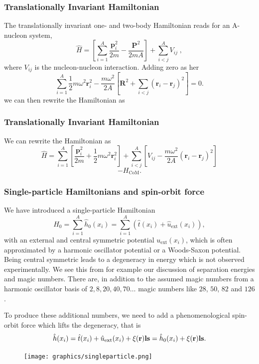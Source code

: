 \documentclass[compress]{beamer}
\renewcommand{\vec}[1]{\mathbf{#1}}
\renewcommand{\vec}[1]{\boldsymbol{#1}}
\begin{document}
 \frame
 {
 \frametitle{Translationally Invariant Hamiltonian}
 The translationally invariant one- and two-body 
 Hamiltonian reads
 for an A-nucleon system,
 \[\label{eq:ham}
\hat{H}=\left[\sum_{i=1}^A\frac{\vec{p}_i^2}{2m} -\frac{\vec{P}^2}{2mA}\right] +\sum_{i<j}^A V_{ij} \; ,
 \]
 where $V_{ij}$ is the nucleon-nucleon interaction. Adding zero as her
 \[
 \sum_{i=1}^A\frac{1}{2}m\omega^2\vec{r}_i^2-
 \frac{m\omega^2}{2A}\left[\vec{R}^2+\sum_{i<j}(\vec{r}_i-\vec{r}_j)^2\right]=0.
 \]
we can then rewrite the Hamiltonian as 
 }



 \frame
 {
 \frametitle{Translationally Invariant Hamiltonian}
 We can rewrite the Hamiltonian as
 \[
 \hat{H}=\sum_{i=1}^A \left[ \frac{\vec{p}_i^2}{2m}
 +\frac{1}{2}m\omega^2 \vec{r}^2_i
 \right] + \sum_{i<j}^A \left[ V_{ij}-\frac{m\omega^2}{2A}
 (\vec{r}_i-\vec{r}_j)^2
 \right]
 \]
 \[
  -H_{\mathrm{CoM}}.
 \]

 }


\frame
{
  \frametitle{Single-particle Hamiltonians and spin-orbit force}
\begin{small}
{\scriptsize
We have introduced a single-particle Hamiltonian
\[
  H_0=\sum_{i=1}^A \hat{h}_0(x_i) =  \sum_{i=1}^A\left(\hat{t}(x_i) + \hat{u}_{\mathrm{ext}}(x_i)\right),
\]
with an external and central symmetric potential $u_{\mathrm{ext}}(x_i)$, which is often 
approximated by a harmonic oscillator potential or a Woods-Saxon potential. Being central symmetric leads to a degeneracy 
in energy which is not observed experimentally. We see this from for example our discussion of separation energies and magic numbers. There are, in addition to the assumed magic numbers from a harmonic oscillator basis of $2,8,20,40,70\dots$ magic numbers like $28$, $50$, $82$ and $126$. 

To produce these additional numbers, we need to add a phenomenological spin-orbit force which lifts the degeneracy, that is
\[
\hat{h}(x_i) =  \hat{t}(x_i) + \hat{u}_{\mathrm{ext}}(x_i) +\xi({\bf r}){\bf ls}=\hat{h}_0(x_i)+\xi({\bf r}){\bf ls}. 
\]

}
\end{small}
}


\frame
{
    \begin{figure}
    \centering
            \texttt{[image: graphics/singleparticle.png]}
    \end{figure}
}
\end{document}
